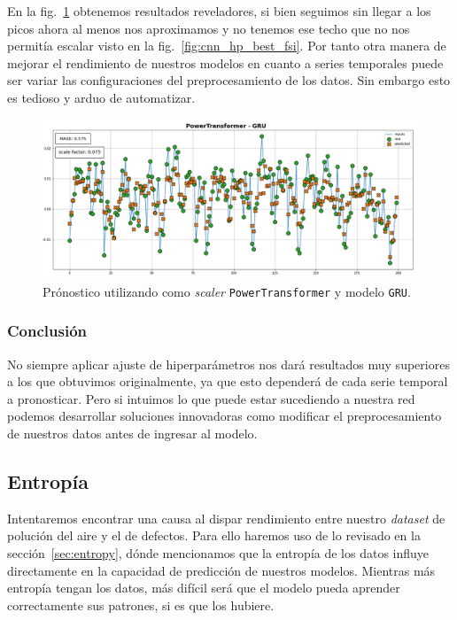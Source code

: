 \documentclass[a4paper,12pt]{article}
\begin{document}
En la fig.~\ref{fig:powertrafo_forecast} obtenemos resultados reveladores, si bien seguimos sin llegar a los picos ahora al menos nos aproximamos y no tenemos ese techo que no nos permitía escalar visto en la fig.~\ref{fig:cnn_hp_best_fsi}. Por tanto otra manera de mejorar el rendimiento de nuestros modelos en cuanto a series temporales puede ser variar las configuraciones del preprocesamiento de los datos. Sin embargo esto es tedioso y arduo de automatizar.

\begin{figure}[H]
	\begin{center}
	\includegraphics[width=1\textwidth]{powertrafo_forecast.png}
  	\caption{Prónostico utilizando como \textit{scaler} \texttt{PowerTransformer} y modelo \texttt{GRU}.}
  	\label{fig:powertrafo_forecast}
  	\end{center}
\end{figure}

\subsubsection{Conclusión}
No siempre aplicar ajuste de hiperparámetros nos dará resultados muy superiores a los que obtuvimos originalmente, ya que esto dependerá de cada serie temporal a pronosticar. Pero si intuimos lo que puede estar sucediendo a nuestra red podemos desarrollar soluciones innovadoras como modificar el preprocesamiento de nuestros datos antes de ingresar al modelo.

\subsection{Entropía}
Intentaremos encontrar una causa al dispar rendimiento entre nuestro \textit{dataset} de polución del aire y el de defectos. Para ello haremos uso de lo revisado en la sección~\ref{sec:entropy}, dónde mencionamos que la entropía de los datos influye directamente en la capacidad de predicción de nuestros modelos. Mientras más entropía tengan los datos, más difícil será que el modelo pueda aprender correctamente sus patrones, si es que los hubiere.
\end{document}
